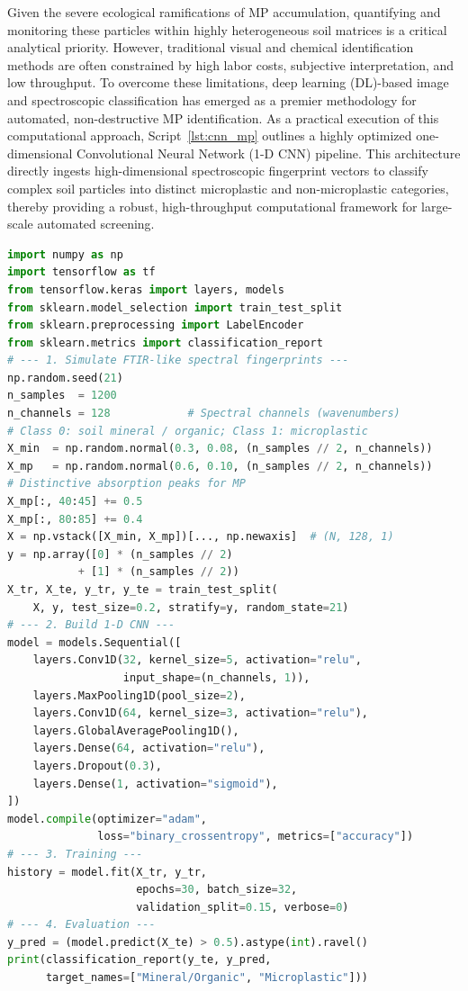 \documentclass[land,article,submit,pdftex,moreauthors]{Definitions/mdpi}
\begin{document}
Given the severe ecological ramifications of MP accumulation, quantifying and monitoring these particles within highly heterogeneous soil matrices is a critical analytical priority. However, traditional visual and chemical identification methods are often constrained by high labor costs, subjective interpretation, and low throughput. To overcome these limitations, deep learning (DL)-based image and spectroscopic classification has emerged as a premier methodology for automated, non-destructive MP identification. As a practical execution of this computational approach, Script~\ref{lst:cnn_mp} outlines a highly optimized one-dimensional Convolutional Neural Network (1-D CNN) pipeline. This architecture directly ingests high-dimensional spectroscopic fingerprint vectors to classify complex soil particles into distinct microplastic and non-microplastic categories, thereby providing a robust, high-throughput computational framework for large-scale automated screening.

\begin{lstlisting}[language=Python,basicstyle=\scriptsize\ttfamily,
    caption={Python workflow: 1-D Convolutional Neural Network (CNN) for
             microplastic classification from spectral fingerprints
             (Script~3).},
    label={lst:cnn_mp}]
import numpy as np
import tensorflow as tf
from tensorflow.keras import layers, models
from sklearn.model_selection import train_test_split
from sklearn.preprocessing import LabelEncoder
from sklearn.metrics import classification_report
# --- 1. Simulate FTIR-like spectral fingerprints ---
np.random.seed(21)
n_samples  = 1200
n_channels = 128            # Spectral channels (wavenumbers)
# Class 0: soil mineral / organic; Class 1: microplastic
X_min  = np.random.normal(0.3, 0.08, (n_samples // 2, n_channels))
X_mp   = np.random.normal(0.6, 0.10, (n_samples // 2, n_channels))
# Distinctive absorption peaks for MP
X_mp[:, 40:45] += 0.5
X_mp[:, 80:85] += 0.4
X = np.vstack([X_min, X_mp])[..., np.newaxis]  # (N, 128, 1)
y = np.array([0] * (n_samples // 2)
           + [1] * (n_samples // 2))
X_tr, X_te, y_tr, y_te = train_test_split(
    X, y, test_size=0.2, stratify=y, random_state=21)
# --- 2. Build 1-D CNN ---
model = models.Sequential([
    layers.Conv1D(32, kernel_size=5, activation="relu",
                  input_shape=(n_channels, 1)),
    layers.MaxPooling1D(pool_size=2),
    layers.Conv1D(64, kernel_size=3, activation="relu"),
    layers.GlobalAveragePooling1D(),
    layers.Dense(64, activation="relu"),
    layers.Dropout(0.3),
    layers.Dense(1, activation="sigmoid"),
])
model.compile(optimizer="adam",
              loss="binary_crossentropy", metrics=["accuracy"])
# --- 3. Training ---
history = model.fit(X_tr, y_tr,
                    epochs=30, batch_size=32,
                    validation_split=0.15, verbose=0)
# --- 4. Evaluation ---
y_pred = (model.predict(X_te) > 0.5).astype(int).ravel()
print(classification_report(y_te, y_pred,
      target_names=["Mineral/Organic", "Microplastic"]))
\end{lstlisting}
\end{document}
